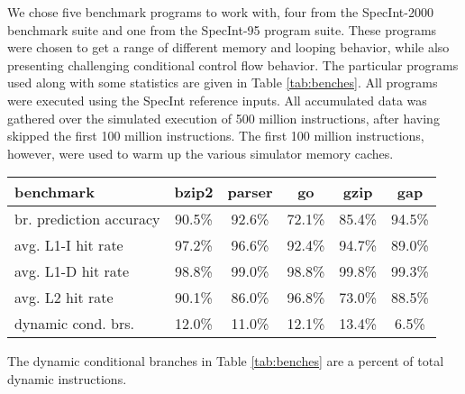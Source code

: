 \documentclass[10pt,twocolumn,dvips]{article}
\begin{document}
We chose five benchmark programs to work with,
four from the SpecInt-2000 benchmark suite
and one from the SpecInt-95 program suite.
These programs were chosen to get a range of different memory and looping
behavior, while also presenting challenging conditional control flow
behavior.
The particular programs used along with some statistics 
are given in Table \ref{tab:benches}.
All programs were executed using the SpecInt reference inputs.
All accumulated data was gathered over the simulated execution of
500 million instructions,
after having skipped the first 100 million instructions.
The first 100 million instructions, however, were used to warm up the
various simulator memory caches.
%
\begin{table*}
\scriptsize{
\begin{center}
\caption{Benchmarks Programs Simulated and Some Statistics.}
\label{tab:benches}
\begin{tabular}{|l|c|c|c|c|c|}
\hline 
benchmark&bzip2&parser&go&gzip&gap\\
\hline 
\hline 
br. prediction accuracy&90.5\%&92.6\%&72.1\%&85.4\%&94.5\%\\
\hline 
avg. L1-I hit rate&97.2\%&96.6\%&92.4\%&94.7\%&89.0\%\\
\hline 
avg. L1-D hit rate&98.8\%&99.0\%&98.8\%&99.8\%&99.3\%\\
\hline 
avg. L2 hit rate&90.1\%&86.0\%&96.8\%&73.0\%&88.5\%\\
\hline 
dynamic cond. brs.&12.0\%&11.0\%&12.1\%&13.4\%&6.5\%\\
\hline
\end{tabular}
\end{center}
}
\end{table*}
%
The dynamic conditional branches in Table \ref{tab:benches} are
a percent of total dynamic instructions.
%
%
\end{document}
